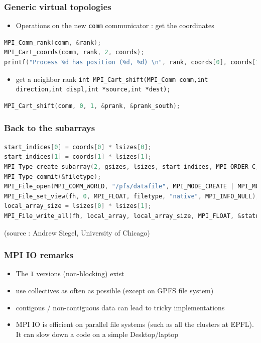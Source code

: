 \begin{frame}[containsverbatim]
\frametitle{Generic virtual topologies}
\begin{itemize}
	\item{Operations on the new \verb+comm+ communicator : get the coordinates}
\end{itemize}

\begin{lstlisting}[language=C,frame=lines]
MPI_Comm_rank(comm, &rank);
MPI_Cart_coords(comm, rank, 2, coords);
printf("Process %d has position (%d, %d) \n", rank, coords[0], coords[1]);
\end{lstlisting}

\begin{itemize}
	\item{get a neighbor rank \verb+int MPI_Cart_shift(MPI_Comm comm,int direction,int displ,int *source,int *dest);+}
\end{itemize}

\begin{lstlisting}[language=C,frame=lines]
MPI_Cart_shift(comm, 0, 1, &prank, &prank_south);
\end{lstlisting}

\end{frame}




\begin{frame}[containsverbatim]
\frametitle{Back to the subarrays}
\begin{lstlisting}[language=C,frame=lines]
start_indices[0] = coords[0] * lsizes[0];
start_indices[1] = coords[1] * lsizes[1];
MPI_Type_create_subarray(2, gsizes, lsizes, start_indices, MPI_ORDER_C, MPI_FLOAT, &filetype);
MPI_Type_commit(&filetype);
MPI_File_open(MPI_COMM_WORLD, "/pfs/datafile", MPI_MODE_CREATE | MPI_MODE_WRONLY, MPI_INFO_NULL, &fh);
MPI_File_set_view(fh, 0, MPI_FLOAT, filetype, "native", MPI_INFO_NULL);
local_array_size = lsizes[0] * lsizes[1];
MPI_File_write_all(fh, local_array, local_array_size, MPI_FLOAT, &status);
\end{lstlisting}
(source : Andrew Siegel, University of Chicago)
\end{frame}

\begin{frame}[containsverbatim]
\frametitle{MPI IO remarks}
\begin{itemize}
	\item {The \verb+I+ versions (non-blocking) exist}
	\item {use collectives as often as possible (except on GPFS file system)}
	\item {contigous / non-contiguous data can lead to tricky implementations}
	\item {MPI IO is efficient on parallel file systems (such as all the clusters at EPFL). It can slow down a code on a simple Desktop/laptop}
\end{itemize}
\end{frame}




